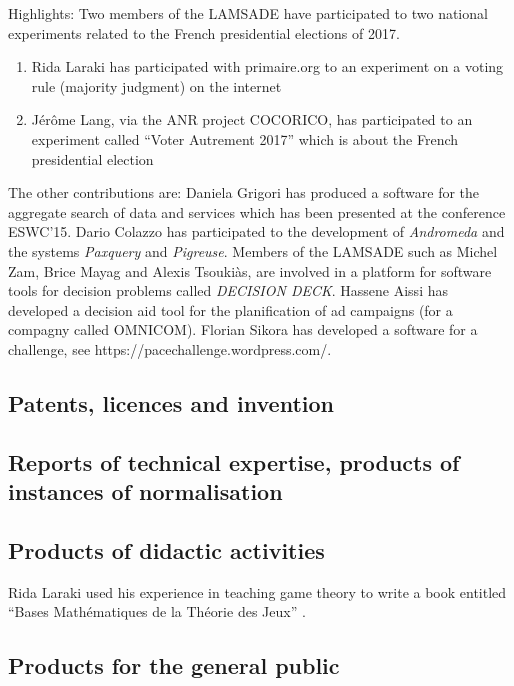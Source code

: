 \documentclass[version=last, pagesize, twoside=semi, DIV=calc, 12pt, a4paper, french, english, bibliography=totoc]{scrartcl}
\begin{document}
Highlights:  Two members of the LAMSADE have participated to two national experiments related to the French presidential elections of 2017. 
\begin{enumerate}
\item Rida Laraki has participated with primaire.org to an experiment on a voting rule (majority judgment) on the internet
\item J\'er\^ome  Lang, via the ANR project COCORICO, has participated to an experiment called ``Voter Autrement 2017'' which is about the French presidential election
\end{enumerate}
The other contributions are: 
Daniela Grigori has produced a software for the aggregate search of data and services which has been presented at the conference ESWC'15.  Dario Colazzo has participated to the development of {\em Andromeda}  and the systems  {\em Paxquery} and {\em Pigreuse}.  Members of the LAMSADE such as Michel Zam, Brice Mayag and Alexis Tsouki\`as, are involved in a platform for software tools for decision problems called {\em DECISION DECK}. Hassene Aissi has developed a decision aid tool  for the planification of ad campaigns (for a compagny called OMNICOM). Florian Sikora has developed a software for a challenge, see https://pacechallenge.wordpress.com/. 


\subsection{Patents, licences and invention}

\subsection{Reports of technical expertise, products of instances of normalisation}

\subsection{Products of didactic activities}


Rida Laraki used his experience in teaching game theory to  write a book entitled ``Bases Math{\'e}matiques de la Th{\'e}orie des Jeux'' .


\subsection{Products for the general public}
\end{document}
